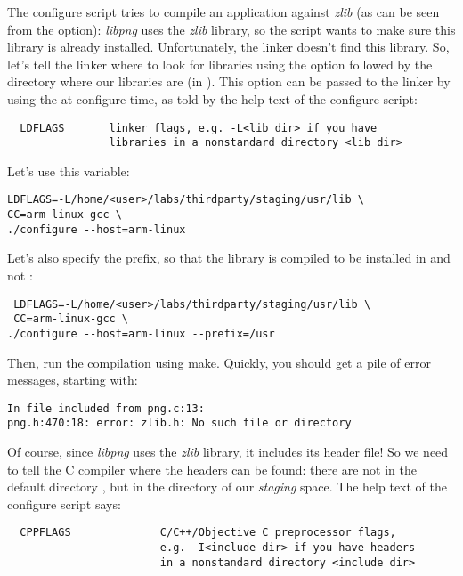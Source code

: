 The configure script tries to compile an application against {\em
  zlib} (as can be seen from the  option): {\em libpng} uses
the {\em zlib} library, so the  script wants to make
sure this library is already installed. Unfortunately, the 
linker doesn't find this library. So, let's tell the linker where to
look for libraries using the  option followed by the
directory where our libraries are (in ). This
 option can be passed to the linker by using the
 at configure time, as told by the help text of the
configure script:

\begin{verbatim}
  LDFLAGS       linker flags, e.g. -L<lib dir> if you have
                libraries in a nonstandard directory <lib dir>
\end{verbatim}

Let's use this  variable:

\begin{verbatim}
LDFLAGS=-L/home/<user>/labs/thirdparty/staging/usr/lib \
CC=arm-linux-gcc \
./configure --host=arm-linux
\end{verbatim}

Let's also specify the prefix, so that the library is compiled to be
installed in  and not :

\begin{verbatim}
 LDFLAGS=-L/home/<user>/labs/thirdparty/staging/usr/lib \
 CC=arm-linux-gcc \
./configure --host=arm-linux --prefix=/usr
\end{verbatim}

Then, run the compilation using make. Quickly, you should get a pile
of error messages, starting with:

\begin{verbatim}
In file included from png.c:13:
png.h:470:18: error: zlib.h: No such file or directory
\end{verbatim}

Of course, since {\em libpng} uses the {\em zlib} library, it includes
its header file! So we need to tell the C compiler where the headers
can be found: there are not in the default directory
, but in the  directory of our
{\em staging} space. The help text of the configure script says:

\begin{verbatim}
  CPPFLAGS              C/C++/Objective C preprocessor flags,
                        e.g. -I<include dir> if you have headers
                        in a nonstandard directory <include dir>
\end{verbatim}

